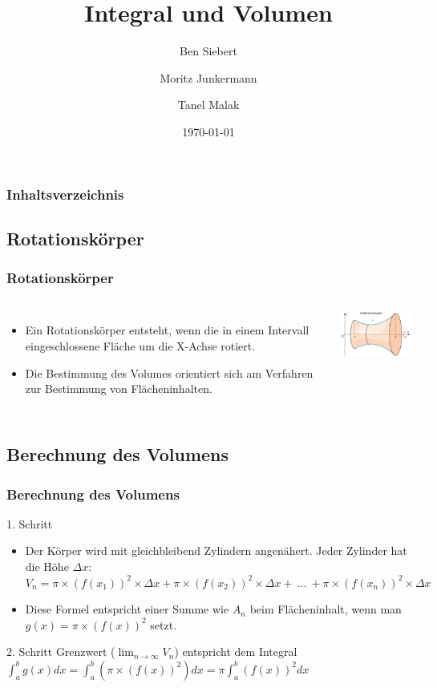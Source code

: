 \documentclass{beamer}
\title{Integral und Volumen}
\author{Ben Siebert \and Moritz Junkermann \and Tanel Malak}
\date{\today}
\begin{document}
	\frame{\titlepage}
	
	\begin{frame}
		\frametitle{Inhaltsverzeichnis}
		\tableofcontents
	\end{frame}
	

	\begin{frame}
		\section{Rotationskörper}
		\frametitle{Rotationskörper}
		
		\begin{columns}
			\column{0.5\textwidth}
				\begin{itemize}
					\item Ein Rotationskörper entsteht, wenn die in einem Intervall eingeschlossene Fläche um die X-Achse rotiert.
					\item Die Bestimmung des Volumes orientiert sich am Verfahren zur Bestimmung von Flächeninhalten.
				\end{itemize}
			\column{0.5\textwidth}
			\includegraphics[width=4cm]{IMG_1121.jpg}
		\end{columns}
	\end{frame}
	
	\begin{frame}
		\section{Berechnung des Volumens}
		\frametitle{Berechnung des Volumens}
		\begin{block}{1. Schritt}
			\begin{itemize}
				\item Der Körper wird mit gleichbleibend Zylindern angenähert. Jeder Zylinder hat die Höhe $\Delta x$: $V_n = \pi \times (f(x_1))^2 \times \Delta x + \pi \times (f(x_2))^2 \times \Delta x +\ ...\ + \pi \times (f(x_n))^2 \times \Delta x$
				\item Diese Formel entspricht einer Summe wie $A_n$ beim Flächeninhalt, wenn man $g(x) = \pi \times (f(x))^2$ setzt. 
			\end{itemize}			
		\end{block}

		
		\begin{block}{2. Schritt}
			Grenzwert ($\lim_{n\to\infty} V_n$) entspricht dem Integral $\int_{a}^{b} g(x) dx = \int_{a}^{b} (\pi \times (f(x))^2) dx = \pi \int_{a}^{b} (f(x))^2 dx$
		\end{block}
	\end{frame}
	
\end{document}
